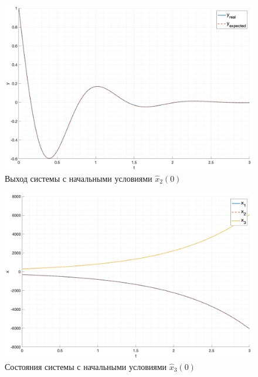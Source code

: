 \begin{figure}[ht!]
    \centering
    \includegraphics[width=\textwidth]{media/plots/task4_output_hat_2.png}
    \caption{Выход системы с начальными условиями $\hat{x}_2(0)$}
    \label{fig:task4_output_hat_2}
\end{figure}

\begin{figure}[ht!]
    \centering
    \includegraphics[width=\textwidth]{media/plots/task4_states_hat_3.png}
    \caption{Состояния системы с начальными условиями $\hat{x}_3(0)$}
    \label{fig:task4_states_hat_3}
\end{figure}

